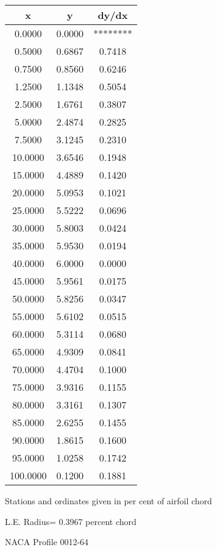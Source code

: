 \documentclass[11pt]{book}
\begin{document}
 \vspace{8mm}
 \begin{tabular}{|c|c|c|} \hline 
  x  &  y  &  dy/dx \\
 \hline
0.0000 & 0.0000 & ******** \\
0.5000 & 0.6867 & 0.7418 \\
0.7500 & 0.8560 & 0.6246 \\
1.2500 & 1.1348 & 0.5054 \\
2.5000 & 1.6761 & 0.3807 \\
5.0000 & 2.4874 & 0.2825 \\
7.5000 & 3.1245 & 0.2310 \\
10.0000 & 3.6546 & 0.1948 \\
15.0000 & 4.4889 & 0.1420 \\
20.0000 & 5.0953 & 0.1021 \\
25.0000 & 5.5222 & 0.0696 \\
30.0000 & 5.8003 & 0.0424 \\
35.0000 & 5.9530 & 0.0194 \\
40.0000 & 6.0000 & 0.0000 \\
45.0000 & 5.9561 & 0.0175 \\
50.0000 & 5.8256 & 0.0347 \\
55.0000 & 5.6102 & 0.0515 \\
60.0000 & 5.3114 & 0.0680 \\
65.0000 & 4.9309 & 0.0841 \\
70.0000 & 4.4704 & 0.1000 \\
75.0000 & 3.9316 & 0.1155 \\
80.0000 & 3.3161 & 0.1307 \\
85.0000 & 2.6255 & 0.1455 \\
90.0000 & 1.8615 & 0.1600 \\
95.0000 & 1.0258 & 0.1742 \\
100.0000 & 0.1200 & 0.1881 \\
 \hline
 \end{tabular}
 \vspace{8mm}


Stations and ordinates given in per cent of airfoil chord 


L.E. Radius=  0.3967 percent chord
 \newpage
  \label{p0012-64}
 \begin{Large}
 NACA Profile 0012-64
 \end{Large}
  
\end{document}
